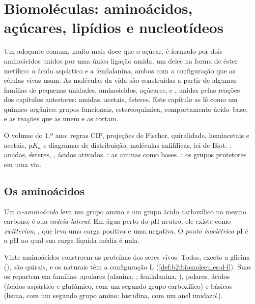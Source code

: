 \chapter{Biomoléculas: aminoácidos, açúcares, lipídios e nucleotídeos}\label{ch:b2:biomolecules}

Um adoçante comum, muito mais doce que o açúcar, é formado por dois aminoácidos unidos por uma única
ligação amida, um deles na forma de éster metílico: o ácido aspártico e a fenilalanina, ambos com a
configuração que as células vivas usam. As moléculas da vida são construídas a partir de algumas
famílias de pequenas unidades, aminoácidos, açúcares,  e , unidas pelas reações
dos capítulos anteriores: amidas, acetais, ésteres. Este capítulo as lê como um químico orgânico:
grupos funcionais, estereoquímica, comportamento ácido--base, e as reações que as unem e as cortam.

\begin{recall}
O volume do 1.º ano: regras CIP, projeções de Fischer, quiralidade, hemiacetais e acetais, $\mathrm pK_a$
e diagramas de distribuição, moléculas anfifílicas, lei de Biot. : amidas,
ésteres, , ácidos ativados. : as aminas como bases.
: os grupos protetores em uma via.
\end{recall}

\section{Os aminoácidos}

\begin{definition}[Aminoácidos]\label{def:b2:biomolecules:amino-acid}
Um \emph{$\alpha$-aminoácido}  leva um grupo
amino e um grupo ácido carboxílico no mesmo carbono;  é sua \emph{cadeia
lateral}. Em água perto do pH neutro, ele existe como \emph{zwitteríon},
, que leva uma carga positiva e uma negativa. O \emph{ponto
isoelétrico} pI é o pH no qual sua carga líquida média é nula.
\end{definition}

Vinte aminoácidos constroem as proteínas dos seres vivos. Todos, exceto a glicina (), são
quirais, e os naturais têm a configuração L (\cref{def:b2:biomolecules:d-l}). Suas  os
repartem em famílias: apolares (alanina, ; fenilalanina, ), polares, ácidos
(ácidos aspártico e glutâmico, com um segundo grupo carboxílico) e básicos (lisina, com um segundo grupo
amino; histidina, com um anel imidazol).

